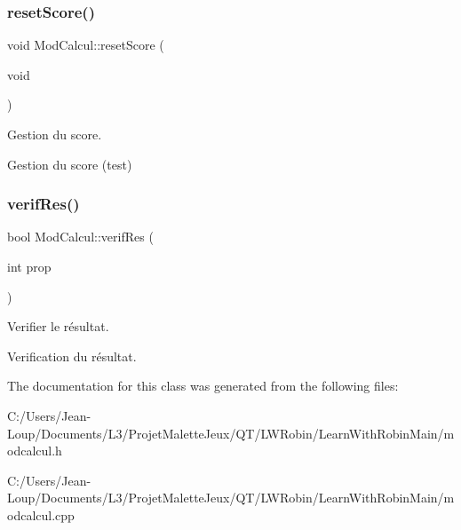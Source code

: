 \subsubsection{\texorpdfstring{reset\+Score()}{resetScore()}}
{\footnotesize\ttfamily void Mod\+Calcul\+::reset\+Score (\begin{DoxyParamCaption}\item[{void}]{ }\end{DoxyParamCaption})}



Gestion du score. 

Gestion du score (test) \mbox{\label{class_mod_calcul_a66c4a1a155a2a74a53bba15967ef1bdb}} 
\subsubsection{\texorpdfstring{verif\+Res()}{verifRes()}}
{\footnotesize\ttfamily bool Mod\+Calcul\+::verif\+Res (\begin{DoxyParamCaption}\item[{int}]{prop }\end{DoxyParamCaption})}



Verifier le résultat. 

Verification du résultat. 

The documentation for this class was generated from the following files\+:\begin{DoxyCompactItemize}
\item 
C\+:/\+Users/\+Jean-\/\+Loup/\+Documents/\+L3/\+Projet\+Malette\+Jeux/\+Q\+T/\+L\+W\+Robin/\+Learn\+With\+Robin\+Main/modcalcul.\+h\item 
C\+:/\+Users/\+Jean-\/\+Loup/\+Documents/\+L3/\+Projet\+Malette\+Jeux/\+Q\+T/\+L\+W\+Robin/\+Learn\+With\+Robin\+Main/modcalcul.\+cpp\end{DoxyCompactItemize}
